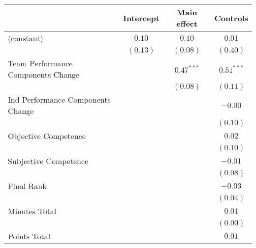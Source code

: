 
\begin{table}
\begin{center}
\begin{tabular}{l c c c }
\toprule
 & Intercept & Main effect & Controls \\
\midrule
(constant)                                               & $0.10$   & $0.10$                & $0.01$                \\
                                                         & $(0.13)$ & $(0.08)$              & $(0.40)$              \\
Team Performance Components Change                       &          & $\mathbf{0.47}^{***}$ & $\mathbf{0.51}^{***}$ \\
                                                         &          & $(0.08)$              & $(0.11)$              \\
Ind Performance Components Change                        &          &                       & $-0.00$               \\
                                                         &          &                       & $(0.10)$              \\
Objective Competence                                     &          &                       & $0.02$                \\
                                                         &          &                       & $(0.10)$              \\
Subjective Competence                                    &          &                       & $-0.01$               \\
                                                         &          &                       & $(0.08)$              \\
Final Rank                                               &          &                       & $-0.03$               \\
                                                         &          &                       & $(0.04)$              \\
Minutes Total                                            &          &                       & $0.01$                \\
                                                         &          &                       & $(0.00)$              \\
Points Total                                             &          &                       & $0.01$                \\

\end{tabular}
\end{center}
\end{table}
